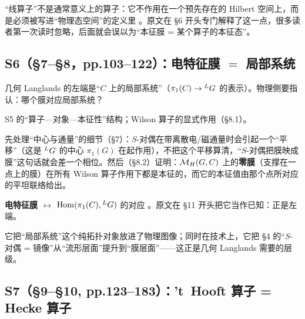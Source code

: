 \begin{warn}
“线算子”不是通常意义上的算子：它不作用在一个预先存在的 Hilbert 空间上，而是必须被写进“物理态空间”的定义里 \pA。原文在 \S6 开头专门解释了这一点，很多读者第一次读时忽略，后面就会误以为“本征膜 = 某个算子的本征态”。
\end{warn}

\subsection{S6（\S7--\S8，pp.103--122）：电特征膜 $=$ 局部系统}

\begin{description}[leftmargin=1.4em]
\item[要解决什么] 几何 Langlands 的左端是“$C$ 上的局部系统”（$\pi_1(C)\to{}^{L}G$ 的表示）。物理侧要指认：哪个膜对应局部系统？
\item[输入] S5 的“算子—对象—本征性”结构；Wilson 算子的显式作用（\S8.1）。
\item[关键动作] 先处理“中心与通量”的细节（\S7）：$S$-对偶在带离散电/磁通量时会引起一个“平移”（这是 ${}^{L}G$ 的中心 $\pi_1(G)$ 在起作用），不把这个平移算清，“$S$-对偶把膜映成膜”这句话就会差一个相位。然后（\S8.2）证明：$\mathcal{M}_H(G,C)$ 上的\textbf{零膜}（支撑在一点上的膜）在所有 Wilson 算子作用下都是本征的，而它的本征值由那个点所对应的平坦联络给出。
\item[产出] \textbf{电特征膜 $\leftrightarrow$ $\mathrm{Hom}(\pi_1(C),{}^{L}G)$} 的对应 \pA{}。原文在 \S11 开头把它当作已知：正是左端。
\item[为什么不可省] 它把“局部系统”这个纯拓扑对象放进了物理图像；同时在技术上，它把 \S4 的“$S$-对偶 = 镜像”从“流形层面”提升到“膜层面”——这正是几何 Langlands 需要的层级。
\end{description}

\subsection{S7（\S9--\S10, pp.123--183）：’t~Hooft 算子 = Hecke 算子}

